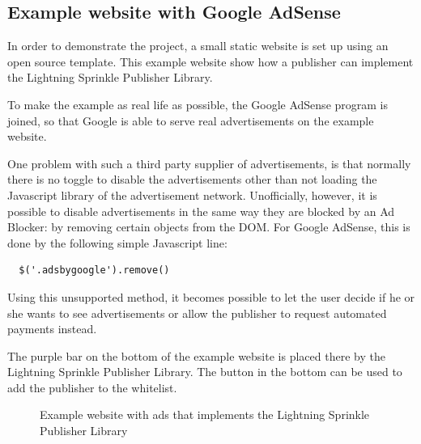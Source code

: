 \subsection{Example website with Google AdSense}
In order to demonstrate the project, a small static website is set up using an open source template. This example website show how a publisher can implement the Lightning Sprinkle Publisher Library. 

To make the example as real life as possible, the Google AdSense program is joined, so that Google is able to serve real advertisements on the example website. 

One problem with such a third party supplier of advertisements, is that normally there is no toggle to disable the advertisements other than not loading the Javascript library of the advertisement network. Unofficially, however, it is possible to disable advertisements in the same way they are blocked by an Ad Blocker: by removing certain objects from the DOM. For Google AdSense, this is done by the following simple Javascript line:


\lstset{language=Javascript}
\lstset{frame=lines}
\lstset{basicstyle=\footnotesize}
\begin{lstlisting}
  $('.adsbygoogle').remove()
\end{lstlisting}

Using this unsupported method, it becomes possible to let the user decide if he or she wants to see advertisements or allow the publisher to request automated payments instead.

The purple bar on the bottom of the example website is placed there by the Lightning Sprinkle Publisher Library. The button in the bottom can be used to add the publisher to the whitelist.

\begin{figure}[h!]
  \setlength{\fboxsep}{0pt}%
  \caption{Example website with ads that implements the Lightning Sprinkle Publisher Library}
\end{figure}